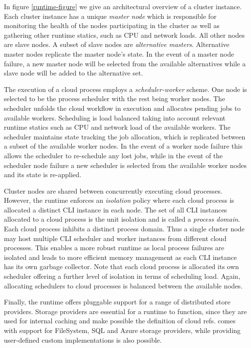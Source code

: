 In figure \ref{runtime-figure} we give an architectural overview of a \mbrace{}
cluster instance. Each cluster instance has a unique \emph{master node} which is
responsible for monitoring the health of the nodes participating in the cluster
as well as gathering other runtime statics, such as CPU and network loads. All
other nodes are slave nodes. A subset of slave nodes are \emph{alternative
  masters}. Alternative master nodes replicate the master node's state. In the
event of a master node failure, a new master node will be selected from the
available alternatives while a slave node will be added to the alternative set.

The execution of a cloud process employs a \emph{scheduler-worker} scheme. One
node is selected to be the process scheduler with the rest being worker
nodes. The scheduler unfolds the cloud workflow in execution and allocates
pending jobs to available workers. Scheduling is load balanced taking into
account relevant runtime statics such as CPU and network load of the available
workers. The scheduler maintains state tracking the job allocation, which is
replicated between a subset of the available worker nodes. In the event of a
worker node failure this allows the scheduler to re-schedule any lost jobs,
while in the event of the scheduler node failure a new scheduler is selected
from the available worker nodes and its state is re-applied.

Cluster nodes are shared between concurrently executing cloud
processes. However, the runtime enforces an \emph{isolation} policy where each
cloud process is allocated a distinct CLI instance in each node. The set of all
CLI instances allocated to a cloud process is the unit isolation and is called a
\emph{process domain}. Each cloud process inhibits a distinct process
domain. Thus a single cluster node may host multiple CLI scheduler and worker
instances from different cloud processes. This enables a more robust runtime as
local process failures are isolated and leads to more efficient memory
management as each CLI instance has its own garbage collector. Note that each
cloud process is allocated its own scheduler offering a further level of
isolation in terms of scheduling load. Again, allocating schedulers to cloud
processes is balanced between the available nodes.

Finally, the \mbrace{} runtime offers pluggable support for a range of
distributed store providers. Storage providers are essential for a runtime to
function, since they are used for internal caching and make possible the
definition of cloud refs. \mbrace{} comes with support for FileSystem, SQL and
Azure storage providers, while providing user-defined custom implementations is
also possible.

